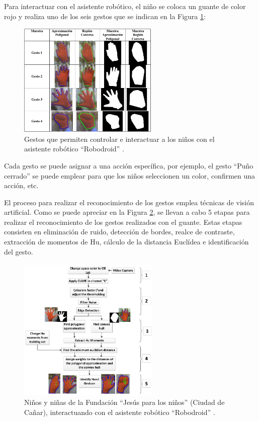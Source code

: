 \documentclass[a4paper,10pt]{article}
\begin{document}
Para interactuar con el asistente robótico, el niño se coloca un guante de color rojo y realiza uno de los seis gestos que se indican en la Figura \ref{Fig:RobodroidGestos}:

\begin{figure}[th!]
	\centering
	\includegraphics[width = 0.6\textwidth]{images/RobodroidGestos.png}
	\caption{Gestos que permiten controlar e interactuar a los niños con el asistente robótico ``Robodroid'' \cite{ochoa2014diseno}.}
	\label{Fig:RobodroidGestos}
\end{figure}

Cada gesto se puede asignar a una acción específica, por ejemplo, el gesto ``Puño cerrado'' se puede emplear para que los niños seleccionen un color, confirmen una acción, etc.

El proceso para realizar el reconocimiento de los gestos emplea técnicas de visión artificial. Como se puede apreciar en la Figura \ref{Fig:RobodroidProcesoVision}, se llevan a cabo 5 etapas para realizar el reconocimiento de los gestos realizados con el guante. Estas etapas consisten en eliminación de ruido, detección de bordes, realce de contraste, extracción de momentos de Hu, cálculo de la distancia Euclídea e identificación del gesto.

\begin{figure}[th!]
	\centering
	\includegraphics[width = 0.6\textwidth]{images/RobodroidProcesoVision.png}
	\caption{Niños y niñas de la Fundación ``Jesús para los niños''  (Ciudad de Cañar), interactuando con el asistente robótico ``Robodroid'' \cite{ochoa2014diseno}.}
	\label{Fig:RobodroidProcesoVision}
\end{figure}
\end{document}
